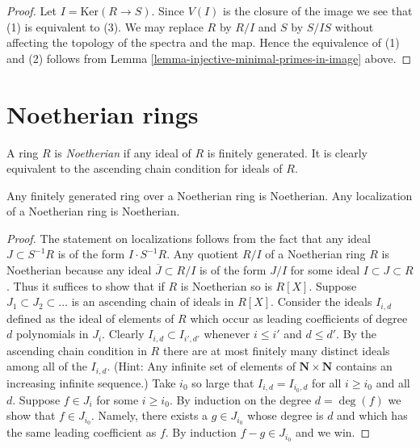 \begin{proof}
Let $I = \text{Ker}(R \to S)$. Since $V(I)$ is the closure of the
image we see that (1) is equivalent to (3). We may replace
$R$ by $R/I$ and $S$ by $S/IS$ without affecting the topology
of the spectra and the map. Hence the equivalence of (1) and (2)
follows from Lemma \ref{lemma-injective-minimal-primes-in-image} above.
\end{proof}








\section{Noetherian rings}
\label{section-Noetherian}

\noindent
A ring $R$ is {\it Noetherian} if any ideal of $R$ is
finitely generated. It is clearly equivalent to the
ascending chain condition for ideals of $R$.

\begin{lemma}
\label{lemma-Noetherian-permanence}
Any finitely generated ring over a Noetherian ring
is Noetherian. Any localization of a Noetherian ring
is Noetherian.
\end{lemma}

\begin{proof}
The statement on localizations follows from the fact
that any ideal $J \subset S^{-1}R$ is of the form
$I \cdot S^{-1}R$. Any quotient $R/I$ of a Noetherian
ring $R$ is Noetherian because any ideal $\overline{J} \subset R/I$
is of the form $J/I$ for some ideal $I \subset J \subset R$.
Thus it suffices to show that if $R$ is Noetherian so
is $R[X]$. Suppose $J_1 \subset J_2 \subset \ldots$ is an
ascending chain of ideals in $R[X]$. Consider the ideals $I_{i, d}$
defined as the ideal of elements of $R$ which occur as leading
coefficients of degree $d$ polynomials in $J_i$.
Clearly $I_{i, d} \subset I_{i', d'}$ whenever
$i \leq i'$ and $d \leq d'$. By the ascending chain condition
in $R$ there are at most finitely many distinct ideals among all of
the $I_{i, d}$.
(Hint: Any infinite set of elements of
$\mathbf{N} \times \mathbf{N}$ contains an increasing
infinite sequence.)
Take $i_0$ so large that $I_{i, d} = I_{i_0, d}$
for all $i \geq i_0$ and all $d$. Suppose $f \in J_i$ for some $i \geq i_0$.
By induction on the degree $d = \deg(f)$ we show that $f \in J_{i_0}$.
Namely, there exists a $g\in J_{i_0}$ whose degree is $d$ and which
has the same leading coefficient as $f$. By induction
$f - g \in J_{i_0}$ and we win.
\end{proof}

